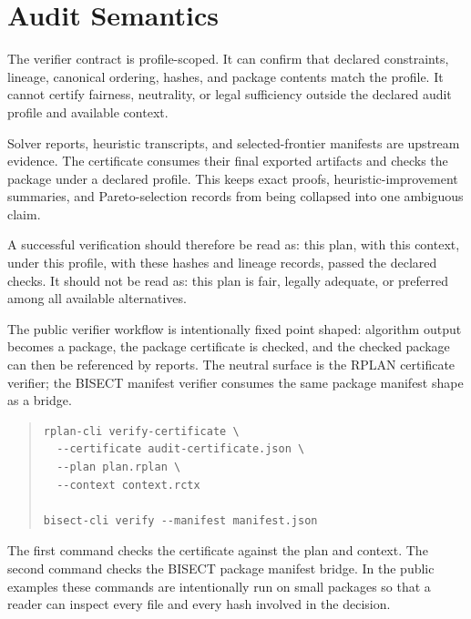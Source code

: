 \section{Audit Semantics}

The verifier contract is profile-scoped. It can confirm that declared
constraints, lineage, canonical ordering, hashes, and package contents match
the profile. It cannot certify fairness, neutrality, or legal sufficiency
outside the declared audit profile and available context.

Solver reports, heuristic transcripts, and selected-frontier manifests are
upstream evidence. The certificate consumes their final exported artifacts and
checks the package under a declared profile. This keeps exact proofs,
heuristic-improvement summaries, and Pareto-selection records from being
collapsed into one ambiguous claim.

A successful verification should therefore be read as: this plan, with this
context, under this profile, with these hashes and lineage records, passed the
declared checks. It should not be read as: this plan is fair, legally adequate,
or preferred among all available alternatives.

The public verifier workflow is intentionally fixed point shaped: algorithm
output becomes a package, the package certificate is checked, and the checked
package can then be referenced by reports. The neutral surface is
the RPLAN certificate verifier; the BISECT manifest verifier consumes the same
package manifest shape as a bridge.

\begin{quote}
\small
\begin{verbatim}
rplan-cli verify-certificate \
  --certificate audit-certificate.json \
  --plan plan.rplan \
  --context context.rctx

bisect-cli verify --manifest manifest.json
\end{verbatim}
\end{quote}

The first command checks the certificate against the plan and context. The
second command checks the BISECT package manifest bridge. In the public
examples these commands are intentionally run on small packages so that a
reader can inspect every file and every hash involved in the decision.

